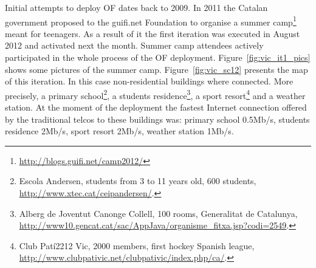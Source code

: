 Initial attempts to deploy OF dates back to 2009. In 2011 the Catalan government proposed to the guifi.net Foundation to organise a summer camp\footnote{\url{http://blogs.guifi.net/camp2012/}} meant for teenagers. As a result of it the first iteration was executed in August 2012 and activated next the month. Summer camp attendees actively participated in the whole process of the OF deployment. Figure~\ref{fig:vic_it1_pics} shows some pictures of the summer camp. Figure~\ref{fig:vic_sc12} presents the map of this iteration. In this case non-residential buildings where connected. More precisely, a primary school\footnote{Escola Andersen, students from 3 to 11 years old, 600 students, \url{http://www.xtec.cat/ceipandersen/}.}, a students residence\footnote{Alberg de Joventut Canonge Collell, 100 rooms, Generalitat de Catalunya, \url{http://www10.gencat.cat/sac/AppJava/organisme_fitxa.jsp?codi=2549}.}, a sport resort\footnote{Club Pat\'{i}2212 Vic, 2000 members, first hockey Spanish league, \url{http://www.clubpativic.net/clubpativic/index.php/ca/}.} and a weather station. At the moment of the deployment the fastest Internet connection offered by the traditional telcos to these buildings was: primary school 0.5Mb/s, students residence 2Mb/s, sport resort 2Mb/s, weather station 1Mb/s.

